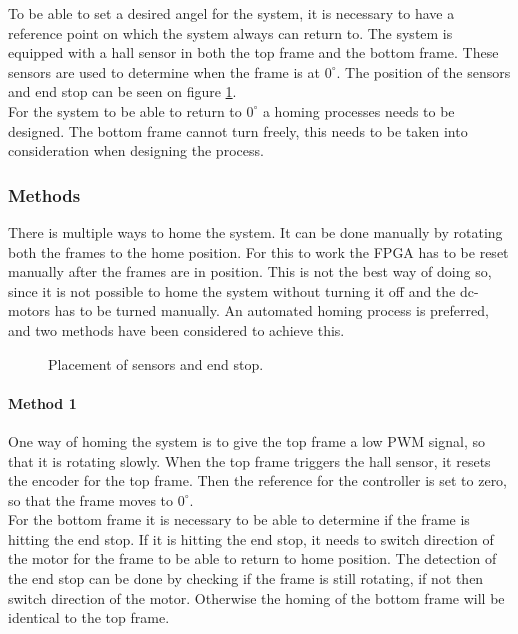 \documentclass[../../../main]{subfiles}
\begin{document}
 
To be able to set a desired angel for the system, it is necessary to have a reference point on which the system always can return to. 
The system is equipped with a hall sensor in both the top frame and the bottom frame.
These sensors are used to determine when the frame is at $0^\circ$. The position of the sensors and end stop can be seen on figure \ref{fig:homing_system}.
\\
For the system to be able to return to $0^\circ$ a homing processes needs to be designed.
The bottom frame cannot turn freely, this needs to be taken into consideration when designing the process.
\subsubsection{Methods} 
There is multiple ways to home the system. It can be done manually by rotating both the frames to the home position.
For this to work the FPGA has to be reset manually after the frames are in position.
This is not the best way of doing so, since it is not possible to home the system without turning it off and the dc-motors has to be turned manually.
An automated homing process is preferred, and two methods have been considered to achieve this. 
\begin{figure}[H]
  \centering
  \def\svgwidth{\textwidth}
  
  \caption{Placement of sensors and end stop.}
  \label{fig:homing_system}
\end{figure}
\paragraph{Method 1}%
\label{par:method_1}
One way of homing the system is to give the top frame a low PWM signal, so that it is rotating slowly. 
When the top frame triggers the hall sensor, it resets the encoder for the top frame. 
Then the reference for the controller is set to zero, so that the frame moves to $0^\circ$. 
\\
For the bottom frame it is necessary to be able to determine if the frame is hitting the end stop. 
If it is hitting the end stop, it needs to switch direction of the motor for the frame to be able to return to home position.
The detection of the end stop can be done by checking if the frame is still rotating, if not then switch direction of the motor.
Otherwise the homing of the bottom frame will be identical to the top frame.
\end{document}
